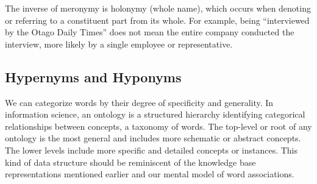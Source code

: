 

The inverse of meronymy is holonymy (whole name), which occurs when denoting or referring to a constituent part from its whole. For example, being ``interviewed by the Otago Daily Times'' does not mean the entire company conducted the interview, more likely by a single employee or representative. 

\subsection{Hypernyms and Hyponyms}

We can categorize words by their degree of specificity and generality. In information science, an ontology is a structured hierarchy identifying categorical relationships between concepts, a taxonomy of words. The top-level or root of any ontology is the most general and includes more schematic or abstract concepts. The lower levels include more specific and detailed concepts or instances. This kind of data structure should be reminiscent of the knowledge base representations mentioned earlier and our mental model of word associations.


